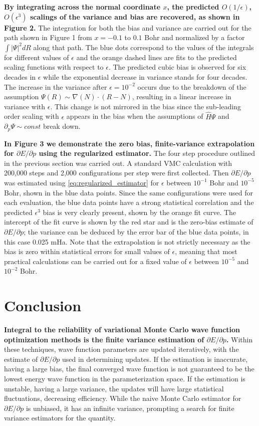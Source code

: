 \documentclass{article}
\begin{document}
\textbf{By integrating across the normal coordinate $x$, the predicted $O(1/\epsilon)$, $O(\epsilon^3)$ scalings of the variance and bias are recovered, as shown in Figure 2.} 
The integration for both the bias and variance are carried out for the path shown in Figure 1 from $x = -0.1$ to $0.1$ Bohr and normalized by a factor $\int |\Psi|^2 dR$ along that path.
The blue dots correspond to the values of the integrals for different values of $\epsilon$ and the orange dashed lines are fits to the predicted scaling functions with respect to $\epsilon$.
The predicted cubic bias is observed for six decades in $\epsilon$ while the exponential decrease in variance stands for four decades.
The increase in the variance after $\epsilon = 10^{-2}$ occurs due to the breakdown of the assumption $\Psi(R) \sim \nabla(N) \cdot (R-N)$, resulting in a linear increase in variance with $\epsilon$.
This change is not mirrored in the bias since the sub-leading order scaling with $\epsilon$ appears in the bias when the assumptions of $\hat{H}\Psi$ and $\partial_p \Psi \sim const$ break down.

\textbf{In Figure 3 we demonstrate the zero bias, finite-variance extrapolation for $\partial E/\partial p$ using the regularized estimator.}
The four step procedure outlined in the previous section was carried out.
A standard VMC calculation with 200,000 steps and 2,000 configurations per step were first collected.
Then $\partial E/\partial p$ was estimated using \eqref{eq:regularized_estimator} for $\epsilon$ between $10^{-1}$ Bohr and $10^{-5}$ Bohr, shown in the blue data points.
Since the same configurations were used for each evaluation, the blue data points have a strong statistical correlation and the predicted $\epsilon^3$ bias is very clearly present, shown by the orange fit curve.
The intercept of the fit curve is shown by the red star and is the zero-bias estimate of $\partial E/\partial p$; the variance can be deduced by the error bar of the blue data points, in this case 0.025 mHa.
Note that the extrapolation is not strictly necessary as the bias is zero within statistical errors for small values of $\epsilon$, meaning that most practical calculations can be carried out for a fixed value of $\epsilon$ between $10^{-5}$ and $10^{-2}$ Bohr.

\section{Conclusion}
\textbf{Integral to the reliability of variational Monte Carlo wave function optimization methods is the finite variance estimation of $\partial E/\partial p$.}
Within these techniques, wave function parameters are updated iteratively, with the estimate of $\partial E/\partial p$ used in determining updates.
If the estimation is inaccurate, having a large bias, the final converged wave function is not guaranteed to be the lowest energy wave function in the parameterization space.
If the estimation is unstable, having a large variance, the updates will have large statistical fluctuations, decreasing efficiency.
While the naive Monte Carlo estimator for $\partial E/\partial p$ is unbiased, it has an infinite variance, prompting a search for finite variance estimators for the quantity.
\end{document}
